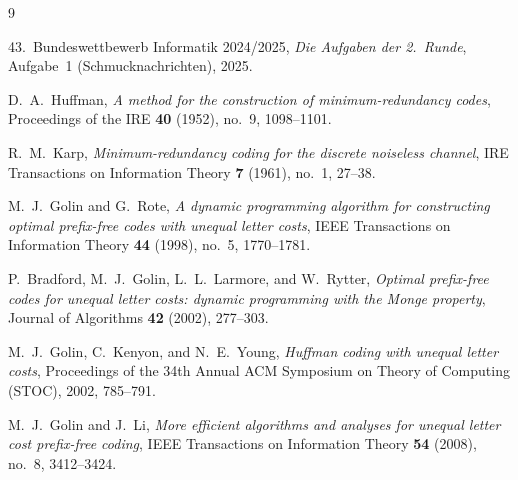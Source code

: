 \documentclass[a4paper,10pt,english]{scrartcl}
\begin{document}
\begin{thebibliography}{9}

43.~Bundeswettbewerb Informatik 2024/2025, \emph{Die Aufgaben der 2.~Runde}, Aufgabe~1 (Schmucknachrichten), 2025.

D.~A.~Huffman,
\emph{A method for the construction of minimum-redundancy codes},
Proceedings of the IRE \textbf{40} (1952), no.~9, 1098--1101.

R.~M.~Karp,
\emph{Minimum-redundancy coding for the discrete noiseless channel},
IRE Transactions on Information Theory \textbf{7} (1961), no.~1, 27--38.

M.~J.~Golin and G.~Rote,
\emph{A dynamic programming algorithm for constructing optimal prefix-free codes with unequal letter costs},
IEEE Transactions on Information Theory \textbf{44} (1998), no.~5, 1770--1781.

P.~Bradford, M.~J.~Golin, L.~L.~Larmore, and W.~Rytter,
\emph{Optimal prefix-free codes for unequal letter costs: dynamic programming with the Monge property},
Journal of Algorithms \textbf{42} (2002), 277--303.

M.~J.~Golin, C.~Kenyon, and N.~E.~Young,
\emph{Huffman coding with unequal letter costs},
Proceedings of the 34th Annual ACM Symposium on Theory of Computing (STOC), 2002, 785--791.

M.~J.~Golin and J.~Li,
\emph{More efficient algorithms and analyses for unequal letter cost prefix-free coding},
IEEE Transactions on Information Theory \textbf{54} (2008), no.~8, 3412--3424.

\end{thebibliography}
\end{document}
